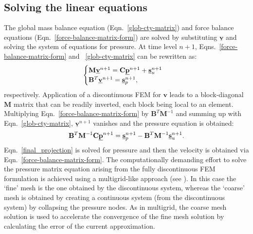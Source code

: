\documentclass[times]{fldauth}
\begin{document}
\subsection{Solving the linear equations}\label{Section:SolvingLinearEqns}
The global mass balance equation (Eqn.~\ref{glob-cty-matrix}) and
force balance equations (Eqn.~\ref{force-balance-matrix-form}) are
solved by substituting $\underline{\mathbf v}$ and solving the system
of equations for pressure. At time level $n+1$,
Eqns.~\ref{force-balance-matrix-form} and ~\ref{glob-cty-matrix} can
be rewritten as:
\begin{displaymath}
  \begin{cases}
    \mathbf{M} \underline{\bf v}^{n+1} = \mathbf{C}\underline{\bf
      p}^{n+1} + \underline{\bf s}_{u}^{n+1} \\ \mathbf{B}^{T}
    \underline{\bf v}^{n+1} = \underline{\bf s}_{p}^{n+1},
  \end{cases}
\end{displaymath}
respectively. Application of a discontinuous FEM for
$\mathbf{v}$ leads to a block-diagonal $\mathbf{M}$ matrix that
can be readily inverted, each block being local to an
element. Multiplying Eqn.~\ref{force-balance-matrix-form} by
$\mathbf{B}^{T}\mathbf{M}^{-1}$ and summing up with
Eqn.~\ref{glob-cty-matrix}, $\underline{\mathbf v}^{n+1}$
vanishes and the pressure equation is obtained:
\begin{equation}
  \mathbf{B}^{T}\mathbf{M}^{-1} \mathbf{C} \underline{\bf p}^{n+1} =
  \underline{\bf s}_{p}^{n+1} - \mathbf{B}^{T} \mathbf{M}^{-1}
  \underline{\bf s}_{u}^{n+1}.
  \label{final_projection}
\end{equation}
Eqn.~\ref{final_projection} is solved for pressure and then the
velocity is obtained via Eqn.~\ref{force-balance-matrix-form}. The
computationally demanding effort to solve the pressure matrix equation
arising from the fully discontinuous FEM formulation is achieved using
a multigrid-like approach (see \cite{Brandt}). In this case the
`fine' mesh is the one obtained by the discontinuous system, whereas
the `coarse' mesh is obtained by creating a continuous system (from
the discontinuous system) by collapsing the pressure nodes. As in
multigrid, the coarse mesh solution is used to accelerate the
convergence of the fine mesh solution by calculating the error of the
current approximation.
\end{document}
